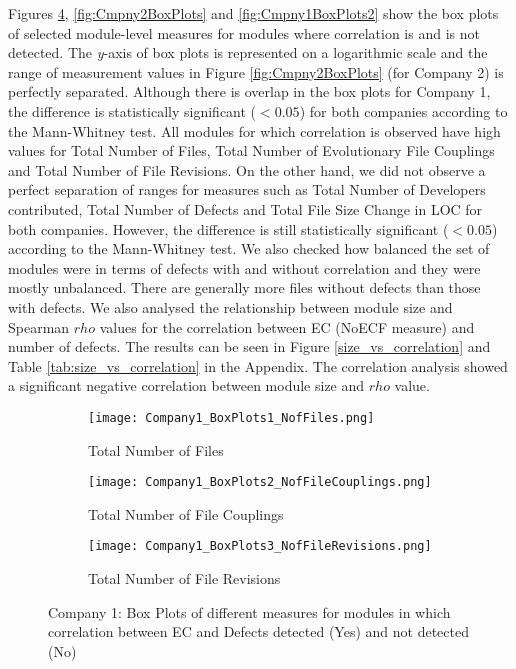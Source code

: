 \documentclass[times]{smrauth}
\begin{document}
Figures \ref{fig:Cmpny1BoxPlots}, \ref{fig:Cmpny2BoxPlots} and \ref{fig:Cmpny1BoxPlots2} show the box plots of selected module-level measures for modules where correlation is and is not detected. The \textit{y}-axis of box plots is represented on a logarithmic scale and the range of measurement values in Figure \ref{fig:Cmpny2BoxPlots} (for Company 2) is perfectly separated. Although there is overlap in the box plots for Company 1, the difference is statistically significant ($<0.05$) for both companies according to the Mann-Whitney test. All modules for which correlation is observed have high values for Total Number of Files, Total Number of Evolutionary File Couplings and Total Number of File Revisions. On the other hand, we did not observe a perfect separation of ranges for measures such as Total Number of Developers contributed, Total Number of Defects and Total File Size Change in LOC for both companies. However, the difference is still statistically significant ($<0.05$) according to the Mann-Whitney test. We also checked how balanced the set of modules were in terms of defects with and without correlation and they were mostly unbalanced. There are generally more files without defects than those with defects. We also analysed the relationship between module size and Spearman $rho$ values for the correlation between EC (NoECF measure) and number of  defects. The results can be seen in Figure \ref{size_vs_correlation} and Table \ref{tab:size_vs_correlation} in the Appendix. The correlation analysis showed a significant negative correlation between module size and $rho$ value. 


\begin{figure}
\begin{subfigure}[b]{0.33\textwidth}
  \texttt{[image: Company1\_BoxPlots1\_NofFiles.png]}
  \caption{Total Number of Files}
  \label{fig:Cmpny1fig1}
\end{subfigure}%
\begin{subfigure}[b]{0.33\textwidth}
  \texttt{[image: Company1\_BoxPlots2\_NofFileCouplings.png]}
  \caption{Total Number of File Couplings}
  \label{fig:Cmpny1fig2}
\end{subfigure}
\begin{subfigure}[b]{0.33\textwidth}
  \texttt{[image: Company1\_BoxPlots3\_NofFileRevisions.png]}
  \caption{Total Number of File Revisions}
  \label{fig:Cmpny1fig3}
\end{subfigure}
\caption{Company 1: Box Plots of different measures for modules in which correlation between EC and Defects detected (Yes) and not detected (No)}
\label{fig:Cmpny1BoxPlots}
\end{figure}
\end{document}
